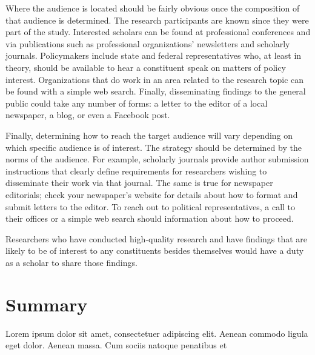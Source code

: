 Where the audience is located should be fairly obvious once the composition of that audience is determined. The research participants are known since they were part of the study. Interested scholars can be found at professional conferences and via publications such as professional organizations' newsletters and scholarly journals. Policymakers include state and federal representatives who, at least in theory, should be available to hear a constituent speak on matters of policy interest. Organizations that do work in an area related to the research topic can be found with a simple web search. Finally, disseminating findings to the general public could take any number of forms: a letter to the editor of a local newspaper, a blog, or even a Facebook post.

Finally, determining how to reach the target audience will vary depending on which specific audience is of interest. The strategy should be determined by the norms of the audience. For example, scholarly journals provide author submission instructions that clearly define requirements for researchers wishing to disseminate their work via that journal. The same is true for newspaper editorials; check your newspaper's website for details about how to format and submit letters to the editor. To reach out to political representatives, a call to their offices or a simple web search should information about how to proceed.

Researchers who have conducted high-quality research and have findings that are likely to be of interest to any constituents besides themselves would have a duty as a scholar to share those findings. 

\section{Summary}\label{ch15:summary}

Lorem ipsum dolor sit amet, consectetuer adipiscing elit. Aenean commodo ligula eget dolor. Aenean massa. Cum sociis natoque penatibus et
